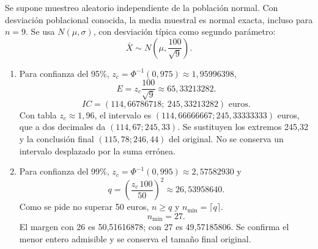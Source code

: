 \documentclass[11pt]{article}
\begin{document}
Se supone muestreo aleatorio independiente de la población normal. Con desviación poblacional conocida, la media muestral es normal exacta, incluso para $n=9$. Se usa $N(\mu,\sigma)$, con desviación típica como segundo parámetro:
\[\bar X\sim N\left(\mu,\frac{100}{\sqrt{9}}\right).\]
\begin{enumerate}[label=(\alph*)]\item Para confianza del 95\%, $z_c=\Phi^{-1}(0,975)\approx1,95996398$,
\[E=z_c\frac{100}{\sqrt{9}}\approx65,33213282.\]
\[IC=\boxed{(114,66786718;\ 245,33213282)}\text{ euros}.\]
Con tabla $z_c\approx1,96$, el intervalo es $(114,66666667;245,33333333)$ euros, que a dos decimales da $(114,67;245,33)$. Se sustituyen los extremos 245,32 y la conclusión final $(115,78;246,44)$ del original. No se conserva un intervalo desplazado por la suma errónea.
\item Para confianza del 99\%, $z_c=\Phi^{-1}(0,995)\approx2,57582930$ y
\[q=\left(\frac{z_c\,100}{50}\right)^2\approx26,53958640.\]
Como se pide no superar 50 euros, $n\geq q$ y $n_{\min}=\lceil q\rceil$.
\[\boxed{n_{\min}=27}.\]
El margen con 26 es 50,51616878; con 27 es 49,57185806. Se confirma el menor entero admisible y se conserva el tamaño final original.
\end{enumerate}
\clearpage
\end{document}
